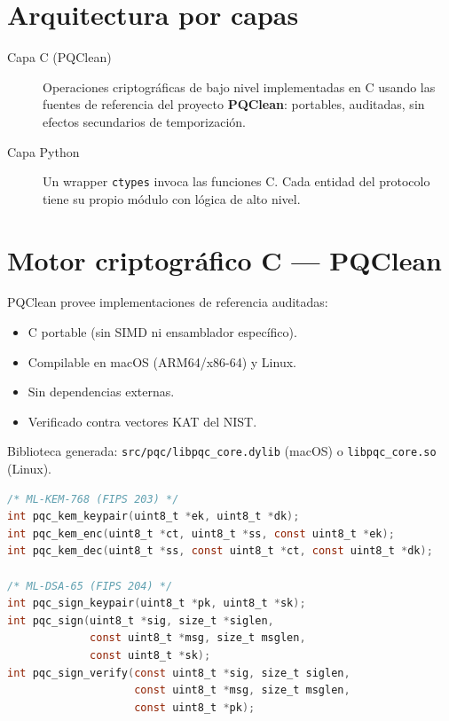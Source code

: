\documentclass[12pt,a4paper,twoside,openright]{book}
\theoremstyle{plain}
\theoremstyle{definition}
\theoremstyle{remark}
\begin{document}
\section{Arquitectura por capas}

\begin{description}
  \item[Capa C (PQClean)] Operaciones criptogr\'aficas de bajo nivel
    implementadas en C usando las fuentes de referencia del proyecto
    \textbf{PQClean}: portables, auditadas, sin efectos secundarios de
    temporizaci\'on.
  \item[Capa Python] Un wrapper \texttt{ctypes} invoca las funciones C.
    Cada entidad del protocolo tiene su propio m\'odulo con l\'ogica de
    alto nivel.
\end{description}

\section{Motor criptogr\'afico C --- PQClean}

PQClean provee implementaciones de referencia auditadas:
\begin{itemize}
  \item C portable (sin SIMD ni ensamblador espec\'ifico).
  \item Compilable en macOS (ARM64/x86-64) y Linux.
  \item Sin dependencias externas.
  \item Verificado contra vectores KAT del NIST.
\end{itemize}

Biblioteca generada: \texttt{src/pqc/libpqc\_core.dylib} (macOS) o
\texttt{libpqc\_core.so} (Linux).

\begin{lstlisting}[language=C, caption={API de la capa C --- pqc\_core.h}]
/* ML-KEM-768 (FIPS 203) */
int pqc_kem_keypair(uint8_t *ek, uint8_t *dk);
int pqc_kem_enc(uint8_t *ct, uint8_t *ss, const uint8_t *ek);
int pqc_kem_dec(uint8_t *ss, const uint8_t *ct, const uint8_t *dk);

/* ML-DSA-65 (FIPS 204) */
int pqc_sign_keypair(uint8_t *pk, uint8_t *sk);
int pqc_sign(uint8_t *sig, size_t *siglen,
             const uint8_t *msg, size_t msglen,
             const uint8_t *sk);
int pqc_sign_verify(const uint8_t *sig, size_t siglen,
                    const uint8_t *msg, size_t msglen,
                    const uint8_t *pk);
\end{lstlisting}
\end{document}
